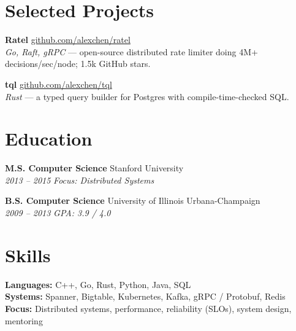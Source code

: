 \documentclass[11pt,letterpaper]{article}
\begin{document}
\section*{Selected Projects}
\textbf{Ratel} \hfill \href{https://github.com/alexchen/ratel}{github.com/alexchen/ratel} \\
\textit{Go, Raft, gRPC} --- open-source distributed rate limiter doing 4M+ decisions/sec/node; 1.5k GitHub stars.\par\vspace{4pt}
\textbf{tql} \hfill \href{https://github.com/alexchen/tql}{github.com/alexchen/tql} \\
\textit{Rust} --- a typed query builder for Postgres with compile-time-checked SQL.

\section*{Education}
\textbf{M.S. Computer Science} \hfill Stanford University \\
\textit{2013 -- 2015} \hfill \textit{Focus: Distributed Systems}\par\vspace{4pt}
\textbf{B.S. Computer Science} \hfill University of Illinois Urbana-Champaign \\
\textit{2009 -- 2013} \hfill \textit{GPA: 3.9 / 4.0}

\section*{Skills}
\textbf{Languages:} C++, Go, Rust, Python, Java, SQL \\
\textbf{Systems:} Spanner, Bigtable, Kubernetes, Kafka, gRPC / Protobuf, Redis \\
\textbf{Focus:} Distributed systems, performance, reliability (SLOs), system design, mentoring
\end{document}

